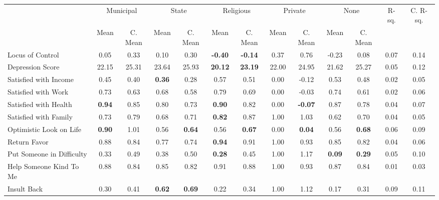 \begin{tabular}{l c c c c c c c c c c c c}
\toprule
& \multicolumn{2}{c}{Municipal} & \multicolumn{2}{c}{State} & \multicolumn{2}{c}{Religious} & \multicolumn{2}{c}{Private} & \multicolumn{2}{c}{None} & R-sq. & C. R-sq. \\
& \scriptsize Mean & \scriptsize C. Mean & \scriptsize Mean & \scriptsize C. Mean & \scriptsize Mean & \scriptsize C. Mean & \scriptsize Mean & \scriptsize C. Mean & \scriptsize Mean & \scriptsize C. Mean & & \\
\midrule
Locus of Control &      0.05 & 0.33 &      0.10 & 0.30 & \textbf{    -0.40} & \textbf{    -0.14} &      0.37 & 0.76 &     -0.23 & 0.08 &      0.07 &      0.14 \\
Depression Score &     22.15 & 25.31 &     23.64 & 25.93 & \textbf{    20.12} & \textbf{    23.19} &     22.00 & 24.95 &     21.62 & 25.27 &      0.05 &      0.12 \\
Satisfied with Income &      0.45 & 0.40 & \textbf{     0.36} & 0.28 &      0.57 & 0.51 &      0.00 & -0.12 &      0.53 & 0.48 &      0.02 &      0.05 \\
Satisfied with Work &      0.73 & 0.63 &      0.68 & 0.58 &      0.79 & 0.69 &      0.00 & -0.03 &      0.74 & 0.61 &      0.02 &      0.06 \\
Satisfied with Health & \textbf{     0.94} & 0.85 &      0.80 & 0.73 & \textbf{     0.90} & 0.82 &      0.00 & \textbf{    -0.07} &      0.87 & 0.78 &      0.04 &      0.07 \\
Satisfied with Family &      0.73 & 0.79 &      0.68 & 0.71 & \textbf{     0.82} & 0.87 &      1.00 & 1.03 &      0.62 & 0.70 &      0.04 &      0.05 \\
Optimistic Look on Life & \textbf{     0.90} & 1.01 &      0.56 & \textbf{     0.64} &      0.56 & \textbf{     0.67} &      0.00 & \textbf{     0.04} &      0.56 & \textbf{     0.68} &      0.06 &      0.09 \\
Return Favor &      0.88 & 0.84 &      0.77 & 0.74 & \textbf{     0.94} & 0.91 &      1.00 & 0.93 &      0.85 & 0.82 &      0.04 &      0.06 \\
Put Someone in Difficulty &      0.33 & 0.49 &      0.38 & 0.50 & \textbf{     0.28} & 0.45 &      1.00 & 1.17 & \textbf{     0.09} & \textbf{     0.29} &      0.05 &      0.10 \\
Help Someone Kind To Me &      0.88 & 0.84 &      0.85 & 0.82 &      0.91 & 0.88 &      1.00 & 0.93 &      0.87 & 0.84 &      0.01 &      0.03 \\
Insult Back &      0.30 & 0.41 & \textbf{     0.62} & \textbf{     0.69} &      0.22 & 0.34 &      1.00 & 1.12 &      0.17 & 0.31 &      0.09 &      0.11 \\
\bottomrule
\end{tabular}

